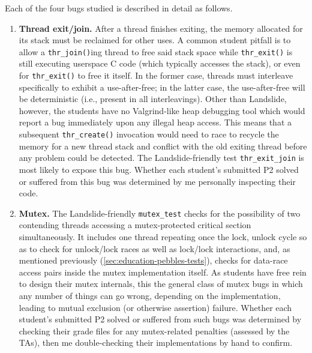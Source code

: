 Each of the four bugs studied is described in detail as follows.

\begin{enumerate}
\item
{\bf Thread exit/join.}
After a thread finishes exiting, the memory allocated for its stack must be reclaimed for other uses.
A common student pitfall is to allow a {\tt thr\_join()}ing thread to free said stack space
while {\tt thr\_exit()} is still executing userspace C code (which typically accesses the stack),
or even for {\tt thr\_exit()} to free it itself.
In the former case, threads must interleave specifically to exhibit a use-after-free;
in the latter case, the use-after-free will be deterministic (i.e., present in all interleavings).
Other than Landslide, however,
the students have no Valgrind-like heap debugging tool which would report a bug immediately upon any illegal heap access.
This means that a subsequent {\tt thr\_create()} invocation would need to race to recycle the memory for a new thread stack
and conflict with the old exiting thread
before any problem could be detected.
The Landslide-friendly test {\tt thr\_exit\_join} is most likely to expose this bug.
Whether each student's submitted P2 solved or suffered from this bug
was determined by me personally inspecting their code.
%

\item
{\bf Mutex.}
The Landslide-friendly {\tt mutex\_test} checks for the possibility of two contending threads
accessing a mutex-protected critical section simultaneously.
It includes one thread repeating once the lock, unlock cycle
so as to check for unlock/lock races as well as lock/lock interactions,
and, as mentioned previously (\cref{sec:education-pebbles-tests}),
checks for data-race access pairs inside the mutex implementation itself.
As students have free rein to design their mutex internals,
this
the general class of mutex bugs
in which any number of things can go wrong, depending on the implementation,
leading to mutual exclusion (or otherwise assertion) failure.
Whether each student's submitted P2 solved or suffered from such bugs
was determined by checking their grade files for any mutex-related penalties (assessed by the TAs),
then me double-checking their implementations by hand to confirm.


\end{enumerate}
